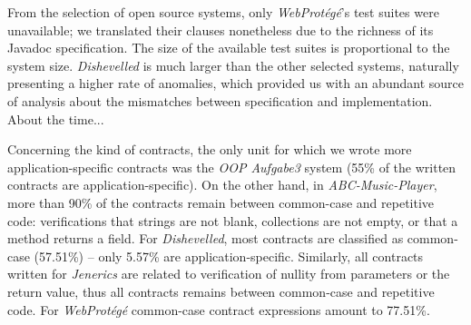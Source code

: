 


From the selection of open source systems, only \emph{WebProtégé}'s test suites were unavailable; we translated their clauses nonetheless due to the richness of its Javadoc specification.
The size of the available test suites is proportional to the system size.
\emph{Dishevelled} is much larger than the other selected systems, naturally presenting a higher rate of anomalies, which provided us with an abundant source of analysis about the mismatches between specification and implementation. 
About the time...



Concerning the kind of contracts, the only unit for which we wrote more application-specific contracts was the \emph{OOP Aufgabe3} system (55\% of the written contracts are application-specific). On the other hand, in \emph{ABC-Music-Player}, more than 90\% of the contracts remain between common-case and repetitive code: verifications that strings are not blank, collections are not empty, or that a method returns a field.
For \emph{Dishevelled}, most contracts are classified as common-case (57.51\%) -- 
only 5.57\% are application-specific.
Similarly, all contracts written for \emph{Jenerics} are related to verification of nullity from parameters or the return value, thus all contracts
remains between common-case and repetitive code.
For \emph{WebProt\'{e}g\'{e}}  common-case contract expressions amount to 77.51\%.  


